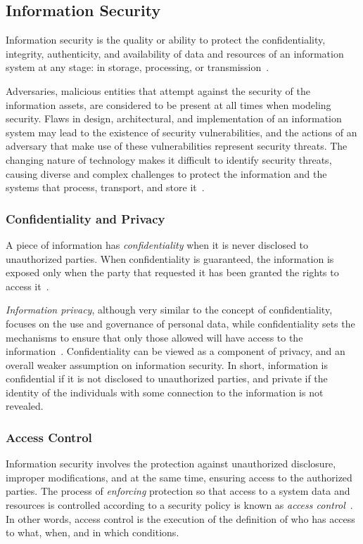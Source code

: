 \documentclass[12pt]{article}
\begin{document}
\subsection{Information Security}

Information security is the quality or ability to protect the confidentiality, integrity, authenticity, and availability of data and resources of an information system at any stage: in storage, processing, or transmission~\cite{whitman2011principles}.

Adversaries, malicious entities that attempt against the security of the information assets, are considered to be present at all times when modeling security. Flaws in design, architectural, and implementation of an information system may lead to the existence of security vulnerabilities, and the actions of an adversary that make use of these vulnerabilities represent security threats. The changing nature of technology makes it difficult to identify security threats, causing diverse and complex challenges to protect the information and the systems that process, transport, and store it~\cite{whitman2003}.

\subsubsection{Confidentiality and Privacy}

A piece of information has \emph{confidentiality} when it is never disclosed to unauthorized parties. When confidentiality is guaranteed, the information is exposed only when the party that requested it has been granted the rights to access it~\cite{whitman2011principles}.

\emph{Information privacy}, although very similar to the concept of confidentiality, focuses on the use and governance of personal data, while confidentiality sets the mechanisms to ensure that only those allowed will have access to the information~\cite{heckman}. Confidentiality can be viewed as a component of privacy, and an overall weaker assumption on information security. In short, information is confidential if it is not disclosed to unauthorized parties, and private if the identity of the individuals with some connection to the information is not revealed.

\subsubsection{Access Control}

Information security involves the protection against unauthorized disclosure, improper modifications, and at the same time, ensuring access to the authorized parties. The process of \emph{enforcing} protection so that access to a system data and resources is controlled according to a security policy is known as \emph{access control}~\cite{access_02}. In other words, access control is the execution of the definition of who has access to what, when, and in which conditions.
\end{document}
